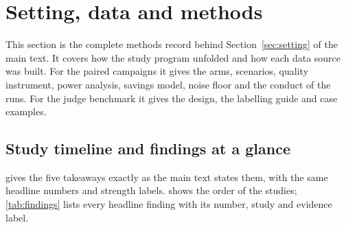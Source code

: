 \documentclass[11pt,letterpaper]{article}
\newcommand{\mainpaper}{the main text}\newcommand{\thissupp}{these appendices}\newcommand{\Thissupp}{These appendices}
\begin{document}
\section{Setting, data and methods}\label{sec:methods}

This section is the complete methods record behind Section~\ref{sec:setting} of \mainpaper{}. It covers how the
study program unfolded and how each data source was built. For the paired campaigns it gives the arms, scenarios,
quality instrument, power analysis, savings model, noise floor and the conduct of the runs. For the judge benchmark it
gives the design, the labelling guide and case examples.

\subsection{Study timeline and findings at a glance}\label{sec:timeline}
 gives the five takeaways exactly as \mainpaper{} states them, with the same headline numbers and
strength labels.  shows the order of the studies; \cref{tab:findings} lists every headline finding with its number,
study and evidence label.
\end{document}
